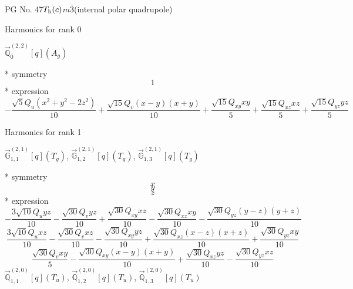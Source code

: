 \documentclass[fleqn,8pt]{jsarticle}
\begin{document}
\setcounter{MaxMatrixCols}{32}

\renewcommand{\tablename}{Table~}
\renewcommand{\figurename}{Figure~}
\begin{center}
\LARGE
PG No. 47\quad$T_{\rm h}(c)$\quad$m\bar{3}$\quad[ cubic ] (internal polar quadrupole)
\end{center}

\noindent * Harmonics for rank 0

\noindent\quad $\vec{\mathbb{Q}}_{0}^{(2,2)}[q](A_{g})$

\noindent\quad ** symmetry
\begin{dmath*}
1
\end{dmath*}
\noindent\quad ** expression
\begin{dmath*}
- \frac{\sqrt{5} Q_{u} \left(x^{2} + y^{2} - 2 z^{2}\right)}{10} + \frac{\sqrt{15} Q_{v} \left(x - y\right) \left(x + y\right)}{10} + \frac{\sqrt{15} Q_{xy} x y}{5} + \frac{\sqrt{15} Q_{xz} x z}{5} + \frac{\sqrt{15} Q_{yz} y z}{5}
\end{dmath*}

\noindent * Harmonics for rank 1

\noindent\quad $\vec{\mathbb{G}}_{1,1}^{(2,1)}[q](T_{g})$, $\vec{\mathbb{G}}_{1,2}^{(2,1)}[q](T_{g})$, $\vec{\mathbb{G}}_{1,3}^{(2,1)}[q](T_{g})$

\noindent\quad ** symmetry
\begin{dmath*}
x
\end{dmath*}
\begin{dmath*}
y
\end{dmath*}
\begin{dmath*}
z
\end{dmath*}
\noindent\quad ** expression
\begin{dmath*}
- \frac{3 \sqrt{10} Q_{u} y z}{10} - \frac{\sqrt{30} Q_{v} y z}{10} + \frac{\sqrt{30} Q_{xy} x z}{10} - \frac{\sqrt{30} Q_{xz} x y}{10} - \frac{\sqrt{30} Q_{yz} \left(y - z\right) \left(y + z\right)}{10}
\end{dmath*}
\begin{dmath*}
\frac{3 \sqrt{10} Q_{u} x z}{10} - \frac{\sqrt{30} Q_{v} x z}{10} - \frac{\sqrt{30} Q_{xy} y z}{10} + \frac{\sqrt{30} Q_{xz} \left(x - z\right) \left(x + z\right)}{10} + \frac{\sqrt{30} Q_{yz} x y}{10}
\end{dmath*}
\begin{dmath*}
\frac{\sqrt{30} Q_{v} x y}{5} - \frac{\sqrt{30} Q_{xy} \left(x - y\right) \left(x + y\right)}{10} + \frac{\sqrt{30} Q_{xz} y z}{10} - \frac{\sqrt{30} Q_{yz} x z}{10}
\end{dmath*}
\noindent\quad $\vec{\mathbb{Q}}_{1,1}^{(2,0)}[q](T_{u})$, $\vec{\mathbb{Q}}_{1,2}^{(2,0)}[q](T_{u})$, $\vec{\mathbb{Q}}_{1,3}^{(2,0)}[q](T_{u})$
\end{document}
